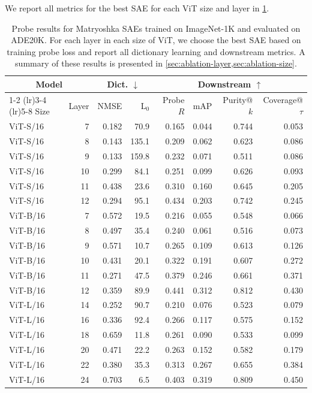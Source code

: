 \documentclass[runningheads]{llncs}
\begin{document}
We report all metrics for the best SAE for each ViT size and layer in \cref{tab:all-ablation-results}.

\begin{table}
    \small
    \centering
    \caption{Probe results for Matryoshka SAEs trained on ImageNet-1K and evaluated on ADE20K. For each layer in each size of ViT, we choose the best SAE based on training probe loss and report all dictionary learning and downstream metrics. A summary of these results is presented in \cref{sec:ablation-layer,sec:ablation-size}.}\label{tab:all-ablation-results}
    \begin{tabular}{lrrrrrrr}
    \toprule
    \multicolumn{2}{c}{Model} & \multicolumn{2}{c}{Dict. $\downarrow$} & \multicolumn{4}{c}{Downstream $\uparrow$} \\
    \cmidrule(lr){1-2} \cmidrule(lr){3-4} \cmidrule(lr){5-8}
    Size & Layer & NMSE & L$_0$ & Probe $R$ & mAP & Purity@$k$ & Coverage@$\tau$ \\
    \midrule
    ViT-S/16 & 7 & 0.182 & 70.9 & 0.165 & 0.044 & 0.744 & 0.053 \\
    ViT-S/16 & 8 & 0.143 & 135.1 & 0.209 & 0.062 & 0.623 & 0.086 \\
    ViT-S/16 & 9 & 0.133 & 159.8 & 0.232 & 0.071 & 0.511 & 0.086 \\
    ViT-S/16 & 10 & 0.299 & 84.1 & 0.251 & 0.099 & 0.626 & 0.093 \\
    ViT-S/16 & 11 & 0.438 & 23.6 & 0.310 & 0.160 & 0.645 & 0.205 \\
    ViT-S/16 & 12 & 0.294 & 95.1 & 0.434 & 0.203 & 0.742 & 0.245 \\
    \midrule
    ViT-B/16 & 7 & 0.572 & 19.5 & 0.216 & 0.055 & 0.548 & 0.066 \\
    ViT-B/16 & 8 & 0.497 & 35.4 & 0.240 & 0.061 & 0.516 & 0.073 \\
    ViT-B/16 & 9 & 0.571 & 10.7 & 0.265 & 0.109 & 0.613 & 0.126 \\
    ViT-B/16 & 10 & 0.431 & 20.1 & 0.322 & 0.191 & 0.607 & 0.272 \\
    ViT-B/16 & 11 & 0.271 & 47.5 & 0.379 & 0.246 & 0.661 & 0.371 \\
    ViT-B/16 & 12 & 0.359 & 89.9 & 0.441 & 0.312 & 0.812 & 0.430 \\
    \midrule
    ViT-L/16 & 14 & 0.252 & 90.7 & 0.210 & 0.076 & 0.523 & 0.079 \\
    ViT-L/16 & 16 & 0.336 & 92.4 & 0.266 & 0.117 & 0.575 & 0.152 \\
    ViT-L/16 & 18 & 0.659 & 11.8 & 0.261 & 0.090 & 0.533 & 0.099 \\
    ViT-L/16 & 20 & 0.471 & 22.2 & 0.263 & 0.152 & 0.582 & 0.179 \\
    ViT-L/16 & 22 & 0.380 & 35.3 & 0.313 & 0.267 & 0.655 & 0.384 \\
    ViT-L/16 & 24 & 0.703 & 6.5 & 0.403 & 0.319 & 0.809 & 0.450 \\
    \bottomrule
    \end{tabular}
\end{table}
\end{document}
